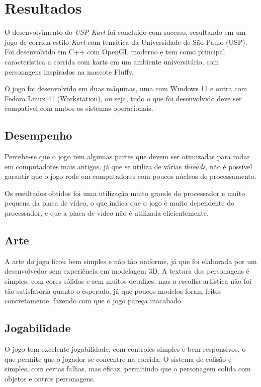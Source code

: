 \chapter{Resultados}

O desenvolvimento do \textit{USP Kart} foi concluído com sucesso, resultando em um jogo de corrida estilo \textit{Kart} com temática da Universidade de São Paulo (USP). Foi desenvolvido em C++ com OpenGL moderno e tem como principal característica a corrida com karts em um ambiente universitário, com personagens inspirados na mascote Fluffy.

O jogo foi desenvolvido em duas máquinas, uma com Windows 11 e outra com Fedora Linux 41 (Workstation), ou seja, tudo o que foi desenvolvido deve ser compatível com ambos os sistemas operacionais.

\section{Desempenho}

Percebe-se que o jogo tem algumas partes que devem ser otimizadas para rodar em computadores mais antigos, já que se utiliza de várias \textit{threads}, não é possível garantir que o jogo rode em computadores com poucos núcleos de processamento.

Os resultados obtidos foi uma utilização muito grande do processador e muito pequena da placa de vídeo, o que indica que o jogo é muito dependente do processador, e que a placa de vídeo não é utilizada eficientemente.

\section{Arte}

A arte do jogo ficou bem simples e não tão uniforme, já que foi elaborada por um desenvolvedor sem experiência em modelagem 3D. A textura dos personagens é simples, com cores sólidas e sem muitos detalhes, mas a escolha artística não foi tão satisfatória quanto o esperado, já que poucos modelos foram feitos concretamente, fazendo com que o jogo pareça inacabado.

\section{Jogabilidade}

O jogo tem excelente jogabilidade, com controles simples e bem responsivos, o que permite que o jogador se concentre na corrida. O sistema de colisão é simples, com certas falhas, mas eficaz, permitindo que o personagem colida com objetos e outros personagens.

